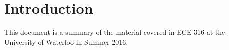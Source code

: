 \documentclass[12pt]{article}
\begin{document}
\section{Introduction}
This document is a summary of the material covered in ECE 316 at the University of Waterloo in Summer 2016.



\end{document}
